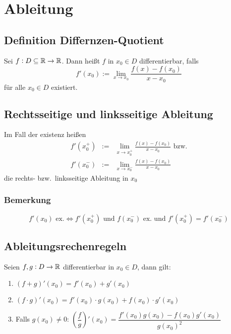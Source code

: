 \section{Ableitung}

\subsection{Definition Differnzen-Quotient}
Sei $f: D \subseteq \mathbb{R} \rightarrow \mathbb{R} $. Dann heißt $f$ in
$x_0 \in D$ differentierbar, falls
\begin{equation*}
    f'(x_0) := \lim_{x \rightarrow x_0}
        \frac{f(x) - f(x_0)}{x - x_0}
\end{equation*}
für alle $x_0 \in D$ existiert.

\subsection{Rechtsseitige und linksseitige Ableitung}
Im Fall der existenz heißen
\begin{eqnarray*}
    f'(x_0^+) &:=& \lim_{x \rightarrow x_0^+}
        \frac{f(x) - f(x_0)}{x-x_0} \text{ bzw.}\\
    f'(x_0^-) &:=& \lim_{x \rightarrow x_0^-}
        \frac{f(x) - f(x_0)}{x-x_0}
\end{eqnarray*}
die rechts- bzw.\ linksseitige Ableitung in $x_0$

\subsubsection{Bemerkung}
\begin{equation*}
    f'(x_0) \text{ ex.} \Leftrightarrow
    f'(x_0^+) \text{ und } f(x_0^-) \text{ ex.\ und }
    f'(x_0^+) = f'(x_0^-)
\end{equation*}

\subsection{Ableitungsrechenregeln}
Seien $f, g: D \rightarrow \mathbb{R}$ differentierbar in $x_0 \in D$, dann gilt:
\begin{enumerate}[label= (\alph*)]
    \item $(f+g)'(x_0) = f'(x_0) + g'(x_0)$
    \item $(f \cdot g)'(x_0) = f'(x_0) \cdot g(x_0) +
                                f(x_0) \cdot g'(x_0)$
    \item Falls $g(x_0) \neq 0$: $\left( \dfrac{f}{g} \right) '(x_0) =
            \dfrac{f'(x_0) g(x_0) - f(x_0) g'(x_0)}{{g(x_0)}^2}$
\end{enumerate}

